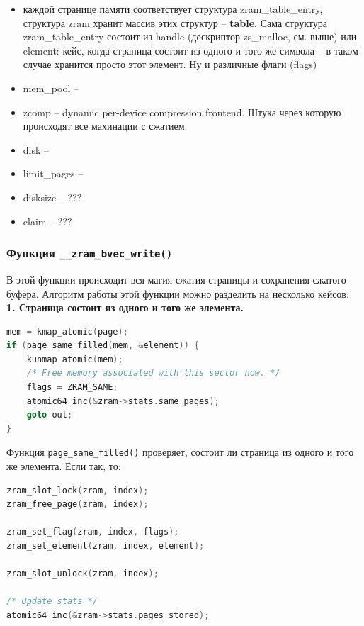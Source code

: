 \documentclass[12pt]{report}
\begin{document}
\begin{itemize}
	\item каждой странице памяти соответствует структура zram\_table\_entry, структура zram хранит массив этих структур -- \textbf{table}. Сама структура zram\_table\_entry состоит из handle (дескриптор zs\_malloc, см. выше) или element: кейс, когда страница состоит из одного и того же символа -- в таком случае хранится просто этот элемент. Ну и различные флаги (flags)
	\item mem\_pool -- 
	\item zcomp -- dynamic per-device compression frontend. Штука через которую происходят все махинации с сжатием.
	\item disk -- 
	\item limit\_pages -- 
	\item disksize -- ???
	\item claim -- ???
\end{itemize}

\subsubsection{Функция \texttt{\_\_zram\_bvec\_write()}}

В этой функции происходит вся магия сжатия страницы и сохранения сжатого буфера. Алгоритм работы этой функции можно разделить на несколько кейсов:\\

\textbf{1. Страница состоит из одного и того же элемента.}

\begin{lstlisting}[language=c]
mem = kmap_atomic(page);
if (page_same_filled(mem, &element)) {
	kunmap_atomic(mem);
	/* Free memory associated with this sector now. */
	flags = ZRAM_SAME;
	atomic64_inc(&zram->stats.same_pages);
	goto out;
}
\end{lstlisting}

Функция \texttt{page\_same\_filled()} проверяет, состоит ли страница из одного и того же элемента. Если так, то:

\begin{lstlisting}[language=c]
zram_slot_lock(zram, index);
zram_free_page(zram, index);

zram_set_flag(zram, index, flags);
zram_set_element(zram, index, element);

zram_slot_unlock(zram, index);

/* Update stats */
atomic64_inc(&zram->stats.pages_stored);
\end{lstlisting}
\end{document}
